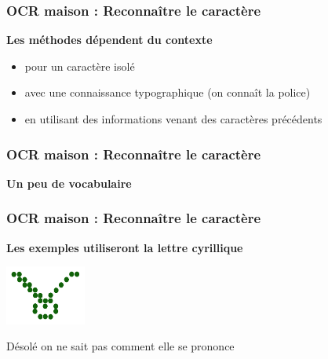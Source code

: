 \documentclass[xcolor=dvipsnames]{beamer}
\begin{document}
\begin{frame}
\frametitle{OCR maison : Reconnaître le caractère }
      \begin{alertblock}{}
            \begin{center}
                  \textbf{\Large Les méthodes dépendent du contexte}
            \end{center}
            \begin{itemize}
            \item pour un caractère isolé
            \item avec une connaissance typographique (on connaît la police)
            \item en utilisant des informations venant des caractères précédents
            \end{itemize}
      \end{alertblock}
\end{frame}


\begin{frame}
\frametitle{OCR maison : Reconnaître le caractère }
%        
      \begin{alertblock}{}
            \begin{center}
                  \textbf{\Large Un peu de vocabulaire}
            \end{center}
      \end{alertblock}
\end{frame}

\begin{frame}
\frametitle{OCR maison : Reconnaître le caractère }
      \begin{alertblock}{}
    \begin{center}
              \textbf{\Large Les exemples utiliseront la lettre cyrillique}
    \end{center}
      \end{alertblock}
    \begin{center}
       \pause
       \includegraphics[width=100px]{chmoll.png}
    \end{center}
      \pause Désolé on ne sait pas comment elle se prononce
\end{frame}
\end{document}
